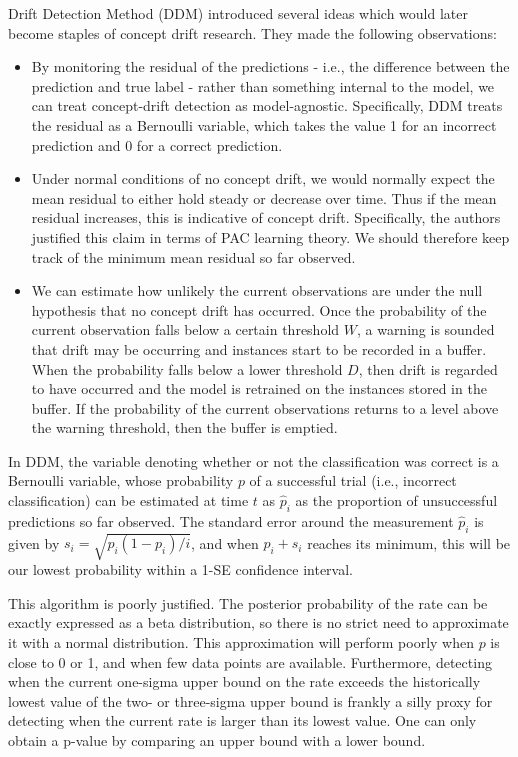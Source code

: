 Drift Detection Method (DDM) introduced several ideas which would later become staples of concept drift research. They made the following observations: 
\begin{itemize}
    \item By monitoring the residual of the predictions - i.e., the difference between the prediction and true label - rather than something internal to the model, we can treat concept-drift detection as model-agnostic. Specifically, DDM treats the residual as a Bernoulli variable, which takes the value 1 for an incorrect prediction and 0 for a correct prediction.
    \item Under normal conditions of no concept drift, we would normally expect the mean residual to either hold steady or decrease over time. Thus if the mean residual increases, this is indicative of concept drift. Specifically, the authors justified this claim in terms of PAC learning theory. We should therefore keep track of the minimum mean residual so far observed.
    \item We can estimate how unlikely the current observations are under the null hypothesis that no concept drift has occurred. Once the probability of the current observation falls below a certain threshold $W$, a warning is sounded that drift may be occurring and instances start to be recorded in a buffer. When the probability falls below a lower threshold $D$, then drift is regarded to have occurred and the model is retrained on the instances stored in the buffer. If the probability of the current observations returns to a level above the warning threshold, then the buffer is emptied.
\end{itemize}
In DDM, the variable denoting whether or not the classification was correct is a Bernoulli variable, whose probability $p$ of a successful trial (i.e., incorrect classification) can be estimated at time $t$ as $\hat{p}_i$ as the proportion of unsuccessful predictions so far observed. The standard error around the measurement $\hat{p}_i$ is given by $s_i = \sqrt{p_i(1-p_i)/i}$, and when $p_i+s_i$ reaches its minimum, this will be our lowest probability within a 1-SE confidence interval.

This algorithm is poorly justified. The posterior probability of the rate can be exactly expressed as a beta distribution, so there is no strict need to approximate it with a normal distribution. This approximation will perform poorly when $p$ is close to 0 or 1, and when few data points are available. Furthermore, detecting when the current one-sigma upper bound on the rate exceeds the historically lowest value of the two- or three-sigma upper bound is frankly a silly proxy for detecting when the current rate is larger than its lowest value. One can only obtain a p-value by comparing an upper bound with a lower bound.

